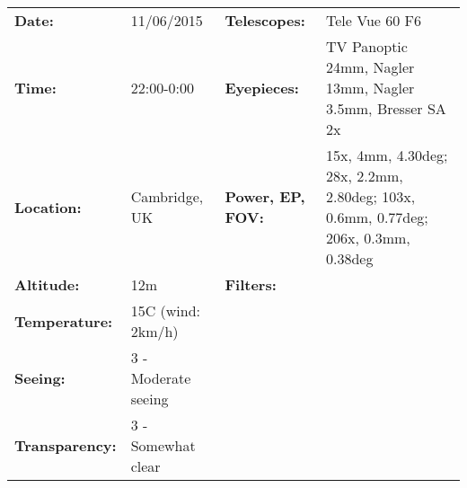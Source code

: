 \begin{tabular}{ p{0.9in} p{1.3in} p{1.2in} p{5.2in}}
{\bf Date:} & 11/06/2015 & {\bf Telescopes:} & Tele Vue 60 F6 \\ 
{\bf Time:} & 22:00-0:00 & {\bf Eyepieces:} & TV Panoptic 24mm, Nagler 13mm, Nagler 3.5mm, Bresser SA 2x \\ 
{\bf Location:} & Cambridge, UK & {\bf Power, EP, FOV:} & 15x, 4mm, 4.30deg; 28x, 2.2mm, 2.80deg; 103x, 0.6mm, 0.77deg; 206x, 0.3mm, 0.38deg \\ 
{\bf Altitude:} & 12m & {\bf Filters:} &  \\ 
{\bf Temperature:} & 15C (wind: 2km/h) & & \\ 
{\bf Seeing:} & 3 - Moderate seeing & & \\ 
{\bf Transparency:} & 3 - Somewhat clear & & \\ 
\end{tabular}
